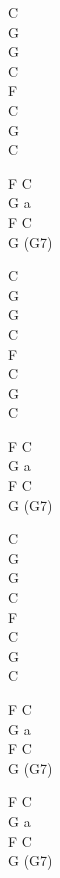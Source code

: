 \begin{chord}

    C\\
    G\\
    G\\
    C\\
    F\\
    C\\
    G\\
    C

    F C\\
    G a\\
    F C\\
    G (G7)

    C\\
    G\\
    G\\
    C\\
    F\\
    C\\
    G\\
    C

    F C\\
    G a\\
    F C\\
    G (G7)

    C\\
    G\\
    G\\
    C\\
    F\\
    C\\
    G\\
    C

    F C\\
    G a\\
    F C\\
    G (G7)

    F C\\
    G a\\
    F C\\
    G (G7)

\end{chord}